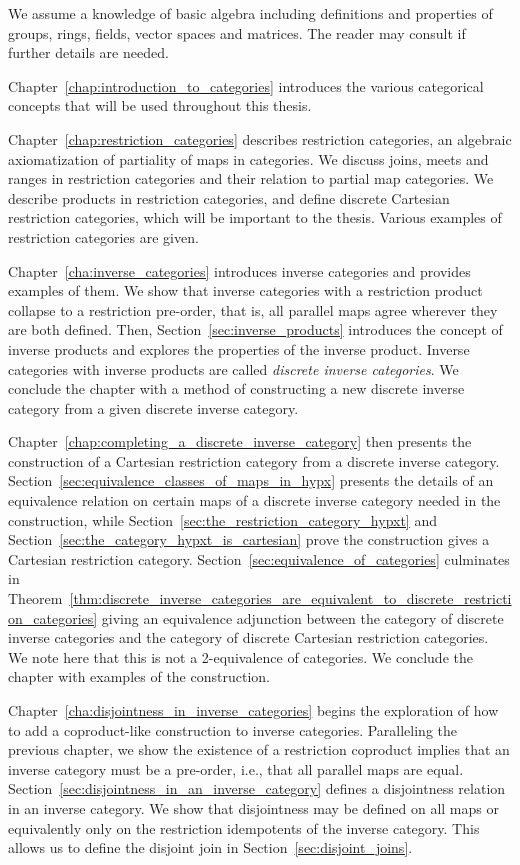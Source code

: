 We assume a knowledge of basic algebra including definitions and properties of groups, rings,
fields, vector spaces and matrices. The reader may consult \cite{lang:algebra} if further details
are needed.

Chapter~\ref{chap:introduction_to_categories} introduces the various categorical concepts that will
be used throughout this thesis.

Chapter~\ref{chap:restriction_categories} describes restriction categories, an algebraic
axiomatization of partiality of maps in categories. We discuss joins, meets and ranges in
restriction categories and their relation to partial map categories. We describe products in
restriction categories, and define discrete Cartesian restriction categories, which will be
important to the thesis. Various examples of restriction categories are given.

Chapter~\ref{cha:inverse_categories} introduces inverse categories and provides examples of them. We
show that inverse categories with a restriction product collapse to a restriction pre-order, that
is, all parallel maps agree wherever they are both defined. Then, Section~\ref{sec:inverse_products}
introduces the concept of inverse products and explores the properties of the inverse
product. Inverse categories with inverse products are called \emph{discrete inverse categories}. We
conclude the chapter with a method of constructing a new discrete inverse category from a given
discrete inverse category.

Chapter~\ref{chap:completing_a_discrete_inverse_category} then presents the construction of a
Cartesian restriction category from a discrete inverse category.
Section~\ref{sec:equivalence_classes_of_maps_in_hypx} presents the details of an equivalence
relation on certain maps of a discrete inverse category needed in the construction, while
Section~\ref{sec:the_restriction_category_hypxt} and
Section~\ref{sec:the_category_hypxt_is_cartesian} prove the construction gives a Cartesian
restriction category. Section~\ref{sec:equivalence_of_categories} culminates in
Theorem~\ref{thm:discrete_inverse_categories_are_equivalent_to_discrete_restriction_categories}
giving an equivalence adjunction between the category of discrete inverse categories and the
category of discrete Cartesian restriction categories. We note here that this is not a 2-equivalence
of categories. We conclude the chapter with examples of the construction.


Chapter~\ref{cha:disjointness_in_inverse_categories} begins the exploration of how to add a
coproduct-like construction to inverse categories. Paralleling the previous chapter, we show the
existence of a restriction coproduct implies that an inverse category must be a pre-order, i.e.,
that all parallel maps are equal. Section~\ref{sec:disjointness_in_an_inverse_category} defines a
disjointness relation in an inverse category. We show that disjointness may be defined on all maps
or equivalently only on the restriction idempotents of the inverse category. This allows us to
define the disjoint join in Section~\ref{sec:disjoint_joins}.

